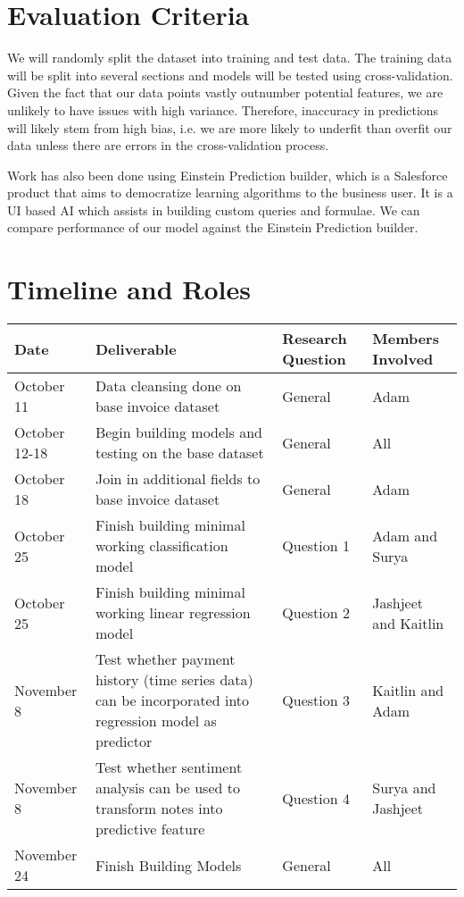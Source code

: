 \documentclass{article}
\begin{document}
\section{Evaluation Criteria}
We will randomly split the dataset into training and test data. The training data will be split into several sections and models will be tested using cross-validation. Given the fact that our data points vastly outnumber potential features, we are unlikely to have issues with high variance. Therefore, inaccuracy in predictions will likely stem from high bias, i.e. we are more likely to underfit than overfit our data unless there are errors in the cross-validation process.  

Work has also been done using Einstein Prediction builder, which is a Salesforce product that aims to democratize learning algorithms to the business user. It is a UI based AI which assists in building custom queries and formulae. We can compare performance of our model against the Einstein Prediction builder.  

\section{Timeline and Roles}

\begin{center}
    \begin{tabular}{p{3cm}|p{6cm}|p{2cm}|p{2cm}}
    \hline
    Date & Deliverable & Research Question & Members Involved \\
    \hline
    October 11 & Data cleansing done on base invoice dataset & General & Adam \\
    \hline
    October 12-18 & Begin building models and testing on the base dataset & General & All \\
    \hline
    October 18 & Join in additional fields to base invoice dataset & General & Adam \\
    \hline
    October 25 & Finish building minimal working classification model & Question 1 & Adam and Surya \\
    \hline
    October 25 & Finish building minimal working linear regression model & Question 2 & Jashjeet and Kaitlin \\
    \hline
    November 8 & Test whether payment history (time series data) can be incorporated into regression model as predictor & Question 3 & Kaitlin and Adam \\
    \hline
    November 8  & Test whether sentiment analysis can be used to transform notes into predictive feature & Question 4 & Surya and Jashjeet \\
    \hline
    November 24 & Finish Building Models & General & All
    \end{tabular}
\end{center}



\newpage


\end{document}
